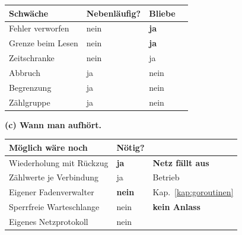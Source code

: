 \begin{aufgabe}
\begin{center}
\renewcommand{\arraystretch}{1.45}
\begin{tabular}{@{}P{3.0cm}P{2.4cm}P{1.8cm}P{1.6cm}@{}}
\toprule
\textbf{Schwäche} & \textbf{Neben\-läufig?} & \textbf{Bliebe} & \\
\midrule
Fehler verworfen & \textcolor{akzent}{nein} & \textcolor{akzent}{\textbf{ja}} & \\
Grenze beim Lesen & \textcolor{akzent}{nein} & \textcolor{akzent}{\textbf{ja}} & \\
Zeitschranke & \textcolor{akzent}{nein} & \textcolor{akzent}{ja} & \\
Abbruch & \textcolor{gruen}{ja} & \textcolor{gruen}{nein} & \\
Begrenzung & \textcolor{gruen}{ja} & \textcolor{gruen}{nein} & \\
Zählgruppe & \textcolor{gruen}{ja} & \textcolor{gruen}{nein} & \\
\bottomrule
\end{tabular}
\end{center}

\begin{center}
\begin{minipage}{0.88\textwidth}
\end{minipage}
\end{center}

\begin{center}
\end{center}

\medskip
\textbf{(c) Wann man aufhört.}

\begin{center}
{\small
\renewcommand{\arraystretch}{1.5}
\begin{tabular}{@{}P{3.2cm}P{2.2cm}P{2.6cm}@{}}
\toprule
\textbf{Möglich wäre noch} & \textbf{Nötig?} & \\
\midrule
Wiederholung mit Rückzug & \textcolor{gruen}{\textbf{ja}} & \textbf{Netz fällt aus}\\
Zählwerte je Verbindung & \textcolor{gruen}{ja} & \textcolor{gruen}{Betrieb}\\
Eigener Fadenverwalter & \textcolor{akzent}{\textbf{nein}} & \textcolor{akzent}{Kap.~\ref{kap:goroutinen}}\\
Sperrfreie Warteschlange & \textcolor{akzent}{nein} & \textcolor{akzent}{\textbf{kein Anlass}}\\
Eigenes Netzprotokoll & \textcolor{akzent}{nein} & \\
\bottomrule
\end{tabular}}
\end{center}


\end{aufgabe}
